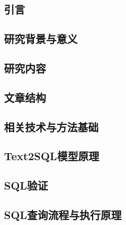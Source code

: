 \documentclass[10.5pt,compsoc,twocolumn]{CjC} %
\theoremstyle{mystyle}
\begin{document}
{\begin{CJK*}{UTF8}{zhhei}\vskip 1mm\section{引言}\end{CJK*}}
{\begin{CJK*}{UTF8}{zhhei}\vskip -0.4mm\subsection{研究背景与意义}\end{CJK*}}

{\begin{CJK*}{UTF8}{zhhei}\vskip 1mm\subsection{研究内容}\end{CJK*}}

{\begin{CJK*}{UTF8}{zhhei}\vskip 1mm\subsection{文章结构}\end{CJK*}}

{\begin{CJK*}{UTF8}{zhhei}\vskip 1mm\section{相关技术与方法基础}\end{CJK*}}
{\begin{CJK*}{UTF8}{zhhei}\subsection{Text2SQL模型原理}\end{CJK*}}

{\begin{CJK*}{UTF8}{zhhei}\vskip 1mm\subsection{SQL验证}\end{CJK*}}

{\begin{CJK*}{UTF8}{zhhei}\vskip 1mm\subsection{SQL查询流程与执行原理}\end{CJK*}}
\end{document}
